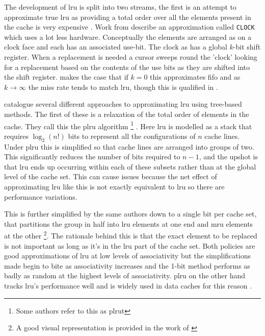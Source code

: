 The development of \gls{lru} is split into two streams, the first is an attempt to approximate true \gls{lru} as providing a total order over all the elements present in the cache is very expensive \cite{soCacheOperationsMRU1988}. Work from \citet{corbatoPagingExperimentMultics1969, eastonUseBitScanning1979} describe an approximation called \texttt{CLOCK} which uses a lot less hardware. Conceptually the elements are arranged as on a clock face and each has an associated use-bit. The clock as has a global $k$-bit shift register. When a replacement is needed a cursor sweeps round the 'clock' looking for a replacement based on the contents of the use bits as they are shifted into the shift register. \citeauthor{corbatoPagingExperimentMultics1969} makes the case that if $k=0$ this approximates \gls{fifo} and as $k \rightarrow \infty$ the miss rate tends to match \gls{lru}, though this is qualified in \citet{eastonUseBitScanning1979}. 

\citet{soCacheOperationsMRU1988} catalogue several different approaches to approximating \gls{lru} using tree-based methods. The first of these is a relaxation of the total order of elements in the cache. They call this the \gls{plru} algorithm \footnote{Some authors refer to this as \gls{plrut}} . Here \gls{lru} is modelled as a stack that requires $\log_2(n!)$ bits to represent all the configurations of $n$ cache lines. Under \gls{plru} this is simplified so that cache lines are arranged into groups of two. This significantly reduces the number of bits required to $n-1$, and the upshot is that \gls{lru} ends up occurring within each of these subsets rather than at the global level of the cache set. This can cause issues because the net effect of approximating \gls{lru} like this is not exactly equivalent to \gls{lru} so there are performance variations. 

This is further simplified by the same authors down to a single bit per cache set, that partitions the group in half into \gls{lru} elements at one end and \gls{mru} elements at the other \footnote{A good visual representation is provided in the work of \citet{damienStudyDifferentCache2007}}. The rationale behind this is that the exact element to be replaced is not important as long as it's in the \gls{lru} part of the cache set. Both policies are good approximations of \gls{lru} at low levels of associativity but the simplifications made begin to bite as associativity increases and the 1-bit method performs as badly as random at the highest levels of associativity. \gls{plru} on the other hand tracks \gls{lru}'s performance well \cite{al-zoubiPerformanceEvaluationCache2004} and is widely used in data caches for this reason \cite{damienStudyDifferentCache2007}.

